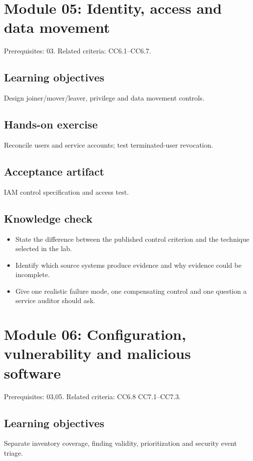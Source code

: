 \documentclass[10pt,oneside]{report}
\begin{document}
\section{Module 05: Identity, access and data movement}
Prerequisites: 03. Related criteria: CC6.1--CC6.7.

\subsection{Learning objectives}
Design joiner/mover/leaver, privilege and data movement controls.

\subsection{Hands-on exercise}
Reconcile users and service accounts; test terminated-user revocation.

\subsection{Acceptance artifact}
IAM control specification and access test.

\subsection{Knowledge check}
\begin{itemize}
\item State the difference between the published control criterion and the technique selected in the lab.
\item Identify which source systems produce evidence and why evidence could be incomplete.
\item Give one realistic failure mode, one compensating control and one question a service auditor should ask.
\end{itemize}

\section{Module 06: Configuration, vulnerability and malicious software}
Prerequisites: 03,05. Related criteria: CC6.8 CC7.1--CC7.3.

\subsection{Learning objectives}
Separate inventory coverage, finding validity, prioritization and security event triage.
\end{document}
